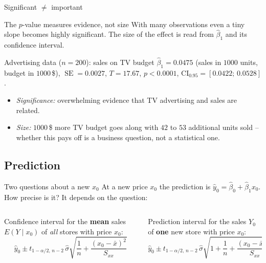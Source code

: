 \documentclass[aspectratio=169,11pt]{beamer}
\begin{document}
\begin{frame}{Significant $\neq$ important}
  \begin{block}{The $p$-value measures evidence, not size}
    With many observations even a tiny slope becomes highly significant. The
    size of the effect is read from $\hat\beta_1$ and its confidence
    interval.
  \end{block}
  \begin{exampleblock}{Advertising data ($n=200$): sales on TV budget}
    $\hat\beta_1=0.0475$ (sales in $1000$ units, budget in $1000$\,\$),
    $\operatorname{SE}=0.0027$, $T=17.67$, $p<0.0001$,
    $\text{CI}_{0.95}=[0.0422;\,0.0528]$.
    \begin{itemize}
      \item \emph{Significance:} overwhelming evidence that TV advertising
            and sales are related.
      \item \emph{Size:} $1000$\,\$ more TV budget goes along with
            $42$ to $53$ additional units sold -- whether this pays off is
            a business question, not a statistical one.
    \end{itemize}
  \end{exampleblock}
\end{frame}

\subsection{Prediction}

\begin{frame}{Two questions about a new $x_0$}
  At a new price $x_0$ the prediction is $\hat y_0=\hat\beta_0+\hat\beta_1x_0$.
  How precise is it? It depends on the question:
  \begin{columns}[T]
    \begin{column}{0.48\textwidth}
      \begin{block}{Confidence interval}
        for the \textbf{mean} sales $E(Y\mid x_0)$ of \emph{all} stores
        with price $x_0$:
        \[
          \hat y_0\pm t_{1-\alpha/2,\,n-2}\,\hat\sigma
          \sqrt{\frac1n+\frac{(x_0-\bar x)^2}{S_{xx}}}
        \]
      \end{block}
    \end{column}
    \begin{column}{0.48\textwidth}
      \begin{block}{Prediction interval}
        for the sales $Y_0$ of \textbf{one} new store with price $x_0$:
        \[
          \hat y_0\pm t_{1-\alpha/2,\,n-2}\,\hat\sigma
          \sqrt{1+\frac1n+\frac{(x_0-\bar x)^2}{S_{xx}}}
        \]
      \end{block}
    \end{column}
  \end{columns}
\end{frame}
\end{document}
